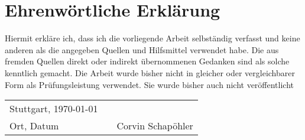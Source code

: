 \chapter*{Ehrenwörtliche Erklärung}
\thispagestyle{empty}
Hiermit erkläre ich, dass ich die vorliegende Arbeit selbständig verfasst und keine anderen als die angegeben Quellen und Hilfsmittel verwendet habe. Die aus fremden Quellen direkt oder indirekt übernommenen Gedanken sind als solche kenntlich gemacht. Die Arbeit wurde bisher nicht in gleicher oder vergleichbarer Form als Prüfungsleistung verwendet. Sie wurde bisher auch nicht veröffentlicht
\vspace{2cm}

\begin{center}
	\begin{tabular}[h]{lp{2cm}p{5.5cm}}
		Stuttgart, \today & & \\
		\cline{1-1}\cline{3-3}
		Ort, Datum& & Corvin Schapöhler\\
	\end{tabular}
\end{center}
